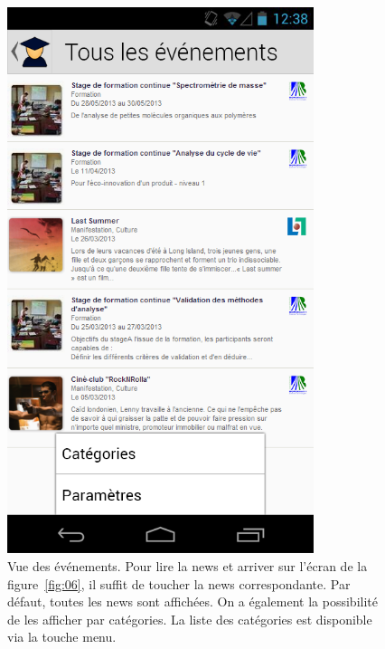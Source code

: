 \documentclass [pdftex,12pt] {report}
\begin{document}
\begin{figure}
\begin{minipage}[t]{8cm}
    \includegraphics[width=0.8\textwidth]{resources/ui_preview/04}
    \caption{Vue des événements. Pour lire la news et arriver sur l'écran de la figure~\ref{fig:06}, il suffit de toucher la news correspondante. Par défaut, toutes les news sont affichées. On a également la possibilité de les afficher par catégories. La liste des catégories est disponible via la touche menu.}
    \label{fig:04}
  \end{minipage}
  \hspace{-60pt}
\end{figure}
\end{document}
